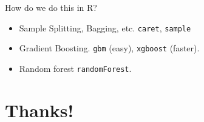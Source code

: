 \documentclass[xcolor=pdftex,dvipsnames,table,mathserif,aspectratio=169]{beamer}
\begin{document}
\begin{frame}{How do we do this in R?}
\begin{itemize}
\item Sample Splitting, Bagging, etc. \texttt{caret}, \texttt{sample}
\item Gradient Boosting. \texttt{gbm} (easy), \texttt{xgboost} (faster).
\item Random forest \texttt{randomForest}.
\end{itemize}
\end{frame}

\section{Thanks!}
\end{document}
